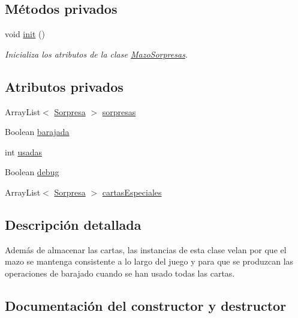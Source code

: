 \subsection*{Métodos privados}
\begin{DoxyCompactItemize}
\item 
void \hyperlink{classcivitas_1_1MazoSorpresas_a8a5c58c8a162c9da0088678f3803c7dd}{init} ()
\begin{DoxyCompactList}\small\item\em Inicializa los atributos de la clase \hyperlink{classcivitas_1_1MazoSorpresas}{Mazo\+Sorpresas}. \end{DoxyCompactList}\end{DoxyCompactItemize}
\subsection*{Atributos privados}
\begin{DoxyCompactItemize}
\item 
Array\+List$<$ \hyperlink{classcivitas_1_1Sorpresa}{Sorpresa} $>$ \hyperlink{classcivitas_1_1MazoSorpresas_a7b0f0b1ab8df542e09240e6e9a4e8f01}{sorpresas}
\item 
Boolean \hyperlink{classcivitas_1_1MazoSorpresas_aec96b369692f1dd8bdffbf76c333ad5f}{barajada}
\item 
int \hyperlink{classcivitas_1_1MazoSorpresas_a49a7af66f4c621ce6b5475bfb6b9090c}{usadas}
\item 
Boolean \hyperlink{classcivitas_1_1MazoSorpresas_a159fe6df17b11fb2f61f9c7e8633a2a8}{debug}
\item 
Array\+List$<$ \hyperlink{classcivitas_1_1Sorpresa}{Sorpresa} $>$ \hyperlink{classcivitas_1_1MazoSorpresas_acd15c95f30ce89bff5b581430f6683ce}{cartas\+Especiales}
\end{DoxyCompactItemize}


\subsection{Descripción detallada}
Además de almacenar las cartas, las instancias de esta clase velan por que el mazo se mantenga consistente a lo largo del juego y para que se produzcan las operaciones de barajado cuando se han usado todas las cartas. 

\subsection{Documentación del constructor y destructor}
\mbox{\label{classcivitas_1_1MazoSorpresas_a2a54e95d3d74c8f73f922dc23554af9e}} 
